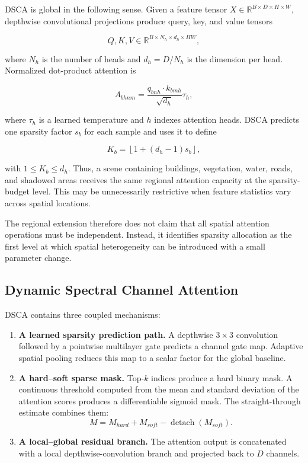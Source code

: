 \documentclass[10pt,twocolumn,letterpaper]{article}
\begin{document}
DSCA is global in the following sense. Given a feature tensor
$X \in \mathbb{R}^{B\times D\times H\times W}$, depthwise convolutional projections produce query, key, and value tensors

\begin{equation}
    Q,K,V \in \mathbb{R}^{B\times N_h\times d_h\times HW},
\end{equation}

where $N_h$ is the number of heads and $d_h=D/N_h$ is the dimension per head. Normalized dot-product attention is

\begin{equation}
    A_{bhnm} = \frac{q_{bn h} \cdot k_{bm h}}{\sqrt{d_h}} \tau_h,
\end{equation}

where $\tau_h$ is a learned temperature and $h$ indexes attention heads. DSCA predicts one sparsity factor $s_b$ for each sample and uses it to define

\begin{equation}
    K_b = \left\lfloor 1 + (d_h-1)s_b \right\rfloor,
\end{equation}

with $1 \leq K_b \leq d_h$. Thus, a scene containing buildings, vegetation, water, roads, and shadowed areas receives the same regional attention capacity at the sparsity-budget level. This may be unnecessarily restrictive when feature statistics vary across spatial locations.

The regional extension therefore does not claim that all spatial attention operations must be independent. Instead, it identifies sparsity allocation as the first level at which spatial heterogeneity can be introduced with a small parameter change.

\subsection{Dynamic Spectral Channel Attention}

DSCA contains three coupled mechanisms:

\begin{enumerate}
    \item \textbf{A learned sparsity prediction path.} A depthwise $3\times3$ convolution followed by a pointwise multilayer gate predicts a channel gate map. Adaptive spatial pooling reduces this map to a scalar factor for the global baseline.

    \item \textbf{A hard--soft sparse mask.} Top-$k$ indices produce a hard binary mask. A continuous threshold computed from the mean and standard deviation of the attention scores produces a differentiable sigmoid mask. The straight-through estimate combines them:
    \begin{equation}
        M = M_{hard} + M_{soft} - \operatorname{detach}(M_{soft}).
    \end{equation}

    \item \textbf{A local--global residual branch.} The attention output is concatenated with a local depthwise-convolution branch and projected back to $D$ channels.
\end{enumerate}
\end{document}

